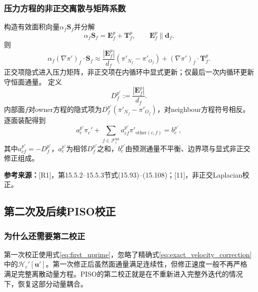 \documentclass[UTF8,12pt,a4paper]{ctexart}
\numberwithin{equation}{section}
\newcommand{\Jasak}{\textnormal{[11]}}
\newcommand{\Rone}{\textnormal{[R1]}}
\newcommand{\source}[1]{\par\smallskip\noindent\colorbox{sourcebg}{%
  \parbox{0.955\linewidth}{\footnotesize\color{sourcegray}\textbf{参考来源：}#1}}\par\smallskip}
\begin{document}
\subsubsection{压力方程的非正交离散与矩阵系数}
构造有效面积向量$\alpha_f\bm S_f$并分解
\begin{equation}
  \alpha_f\bm S_f=\bm E_f^p+\bm T_f^p,\qquad
  \bm E_f^p\parallel\bm d_f.
\end{equation}
则
\begin{equation}
  \alpha_f(\nabla\pi')_f\cdot\bm S_f
  \approx\frac{|\bm E_f^p|}{d_f}
  (\pi'_{N_f}-\pi'_{O_f})
  +(\nabla\pi')_f\cdot\bm T_f^p.
  \label{eq:pprime_nonorth}
\end{equation}
正交项隐式进入压力矩阵，非正交项在内循环中显式更新；仅最后一次内循环更新守恒面通量。
定义
\begin{equation}
  D_f^{p'}:=\frac{|\bm E_f^p|}{d_f}.
\end{equation}
内部面$f$对owner方程的隐式项为$D_f^{p'}(\pi'_{N_f}-\pi'_{O_f})$，对neighbour方程符号相反。逐面装配得到
\begin{equation}
  \boxed{a_c^{p'}\pi_c'
  +\sum_{f\in\mathcal F_c^{\mathrm{int}}}a_{cf}^{p'}
  \pi'_{\mathrm{other}(c,f)}=b_c^{p'},}
  \label{eq:first_pressure_matrix}
\end{equation}
其中$a_{cf}^{p'}=-D_f^{p'}$，$a_c^{p'}$为相邻$D_f^{p'}$之和，$b_c^{p'}$由预测通量不平衡、边界项与显式非正交修正组成。
\source{\Rone，第15.5.2--15.5.3节式(15.93)--(15.108)；\Jasak，非正交Laplacian校正。}

\subsection{第二次及后续PISO校正}
\subsubsection{为什么还需要第二校正}
第一次校正使用式\eqref{eq:first_uprime}，忽略了精确式\eqref{eq:exact_velocity_correction}中的$\mathcal H_c'[\bm u']$。第一次修正后虽然面通量满足连续性，但修正速度一般不再严格满足完整离散动量方程。PISO的第二校正就是在不重新进入完整外迭代的情况下，恢复这部分动量耦合。
\end{document}
